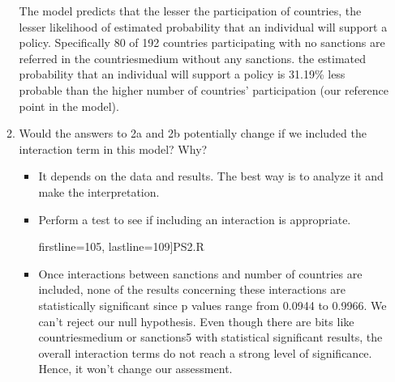 \documentclass[12pt,letterpaper]{article}
\begin{document}
\begin{enumerate}
\begin{enumerate}
		\noindent The model predicts that the lesser the participation of countries, the lesser likelihood of estimated probability that an individual will support a policy. Specifically 80 of 192 countries participating with no sanctions are referred in the countriesmedium without any sanctions. the estimated probability that an individual will support a policy is 31.19\% less probable than the higher number of countries' participation (our reference point in the model).
		\item
		Would the answers to 2a and 2b potentially change if we included the interaction term in this model? Why? 
		\begin{itemize}
			\vspace{1cm}
			
			\item It depends on the data and results. The best way is to analyze it and make the interpretation.
		\item Perform a test to see if including an interaction is appropriate. 
			\vspace{1cm}
			
			 firstline=105, lastline=109]{PS2.R}
			\begingroup
			\obeylines
			\endgroup%
			\item Once interactions between sanctions and number of countries are included, none of the results concerning these interactions are statistically significant since p values range from 0.0944 to 0.9966. We can't reject our null hypothesis. Even though there are bits like countriesmedium or sanctions5 with statistical significant results, the overall interaction terms do not reach a strong level of significance. Hence, it won't change our assessment.
			
		\end{itemize}
	\end{enumerate}
	\end{enumerate}
\end{document}
